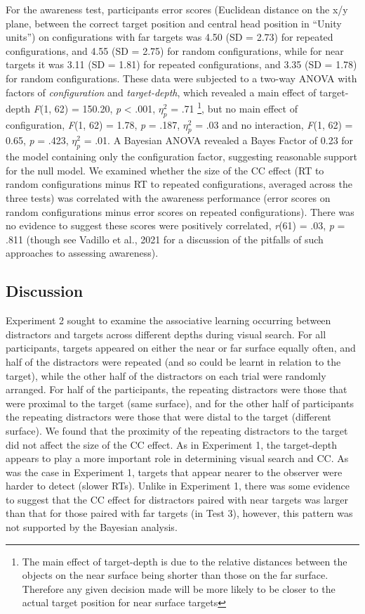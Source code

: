\documentclass[
  man,floatsintext]{apa7}
\begin{document}
For the awareness test, participants error scores (Euclidean distance on the x/y plane, between the correct target position and central head position in ``Unity units'') on configurations with far targets was 4.50 (SD = 2.73) for repeated configurations, and 4.55 (SD = 2.75) for random configurations, while for near targets it was 3.11 (SD = 1.81) for repeated configurations, and 3.35 (SD = 1.78) for random configurations. These data were subjected to a two-way ANOVA with factors of \emph{configuration} and \emph{target-depth}, which revealed a main effect of target-depth \emph{F}(1, 62) = 150.20, \emph{p} \textless{} .001, \(\eta^2_p\) = .71 \footnote{The main effect of target-depth is due to the relative distances between the objects on the near surface being shorter than those on the far surface. Therefore any given decision made will be more likely to be closer to the actual target position for near surface targets}, but no main effect of configuration, \emph{F}(1, 62) = 1.78, \emph{p} = .187, \(\eta^2_p\) = .03 and no interaction, \emph{F}(1, 62) = 0.65, \emph{p} = .423, \(\eta^2_p\) = .01. A Bayesian ANOVA revealed a Bayes Factor of 0.23 for the model containing only the configuration factor, suggesting reasonable support for the null model. We examined whether the size of the CC effect (RT to random configurations minus RT to repeated configurations, averaged across the three tests) was correlated with the awareness performance (error scores on random configurations minus error scores on repeated configurations). There was no evidence to suggest these scores were positively correlated, \emph{r}(61) = .03, \emph{p} = .811 (though see Vadillo et al., 2021 for a discussion of the pitfalls of such approaches to assessing awareness).

\hypertarget{discussion-1}{%
\subsection{Discussion}\label{discussion-1}}

Experiment 2 sought to examine the associative learning occurring between distractors and targets across different depths during visual search. For all participants, targets appeared on either the near or far surface equally often, and half of the distractors were repeated (and so could be learnt in relation to the target), while the other half of the distractors on each trial were randomly arranged. For half of the participants, the repeating distractors were those that were proximal to the target (same surface), and for the other half of participants the repeating distractors were those that were distal to the target (different surface). We found that the proximity of the repeating distractors to the target did not affect the size of the CC effect. As in Experiment 1, the target-depth appears to play a more important role in determining visual search and CC. As was the case in Experiment 1, targets that appear nearer to the observer were harder to detect (slower RTs). Unlike in Experiment 1, there was some evidence to suggest that the CC effect for distractors paired with near targets was larger than that for those paired with far targets (in Test 3), however, this pattern was not supported by the Bayesian analysis.
\end{document}

